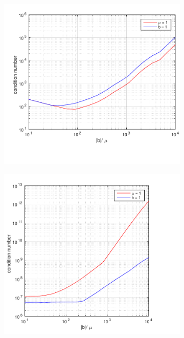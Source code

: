%
\begin{figure}[h!]
  \centering
  \begin{subfigure}[b]{0.48\textwidth}
		\includegraphics[width=\textwidth]{Figures/Spec_difftrans_ConditionNumber.pdf}
  \end{subfigure}%
  \quad
  \begin{subfigure}[b]{0.48\textwidth}
		\includegraphics[width=\textwidth]{Figures/Spec-LS_difftrans_ConditionNumber.pdf}

\end{subfigure}
\end{figure}
